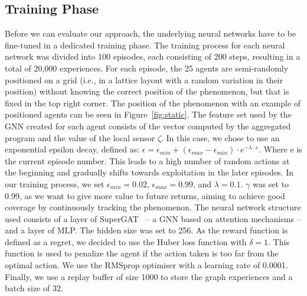 \subsection{Training Phase}
Before we can evaluate our approach, the underlying neural networks have to be fine-tuned in a dedicated training phase.
The training process for each neural network was divided into 100 episodes, each consisting of 200 steps, resulting in a total of 20,000 experiences.
%
For each episode, 
 the 25 agents are semi-randomly positioned on a grid (i.e., in a lattice layout with a random variation in their position) without knowing the correct position of the phenomenon, 
 but that is fixed in the top right corner. The position of the phenomenon with an example of positioned agents can be seen in Figure~\ref{fig:static}. 
 The feature set used by the \ac{GNN} created for each agent consists of the vector computed by the aggregated program and the value of the local sensor $\zeta$.
%
In this case, we chose to use an exponential epsilon decay, defined as:
$
\epsilon = \epsilon_{min} + (\epsilon_{max} - \epsilon_{min}) \cdot e^{-\lambda \cdot e}
$.
Where e is the current episode number. 
This leads to a high number of random actions at the beginning and gradually shifts towards exploitation in the later episodes. 
%
In our training process, 
 we set $\epsilon_{min} = 0.02$, $\epsilon_{max} = 0.99$, and $\lambda = 0.1$.
$\gamma$ was set to 0.99, 
 as we want to give more value to future returns, 
 aiming to achieve good coverage by continuously tracking the phenomenon. 
The neural network structure used consists of a layer of SuperGAT~\cite{DBLP:journals/corr/abs-2204-04879} -- a \ac{GNN} based on attention mechanisms -- and a layer of MLP. 
The hidden size was set to 256.
%
As the reward function is defined as a regret, 
 we decided to use the Huber loss function with $\delta = 1$. %
%
This function is used to penalize the agent if the action taken is too far from the optimal action. 
%
We use the RMSprop optimiser with a learning rate of 0.0001.
%
Finally, we use a replay buffer of size 1000 to store the graph experiences and a batch size of 32.
